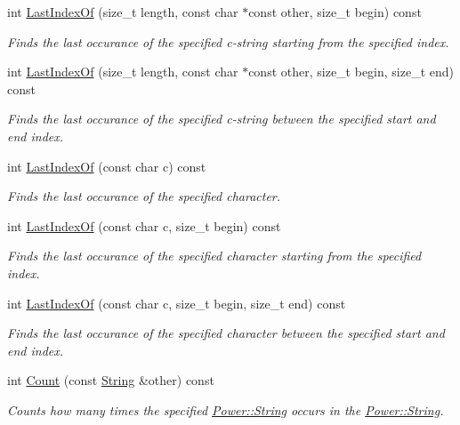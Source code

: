 \begin{DoxyCompactItemize}
int \hyperlink{class_power_1_1_string_a5ba9aa7b251309c1ec5c977f3148e93f}{Last\+Index\+Of} (size\+\_\+t length, const char $\ast$const other, size\+\_\+t begin) const
\begin{DoxyCompactList}\small\item\em Finds the last occurance of the specified c-\/string starting from the specified index. \end{DoxyCompactList}\item 
int \hyperlink{class_power_1_1_string_abf58cac446f5479ae4436974bad5e4af}{Last\+Index\+Of} (size\+\_\+t length, const char $\ast$const other, size\+\_\+t begin, size\+\_\+t end) const
\begin{DoxyCompactList}\small\item\em Finds the last occurance of the specified c-\/string between the specified start and end index. \end{DoxyCompactList}\item 
int \hyperlink{class_power_1_1_string_a5d19cb2d35f6cd396c1910579b5ba89e}{Last\+Index\+Of} (const char c) const
\begin{DoxyCompactList}\small\item\em Finds the last occurance of the specified character. \end{DoxyCompactList}\item 
int \hyperlink{class_power_1_1_string_a0791550659fc2f5c9728eac06208d73c}{Last\+Index\+Of} (const char c, size\+\_\+t begin) const
\begin{DoxyCompactList}\small\item\em Finds the last occurance of the specified character starting from the specified index. \end{DoxyCompactList}\item 
int \hyperlink{class_power_1_1_string_a983604990be4acb0f22ab400b46445ea}{Last\+Index\+Of} (const char c, size\+\_\+t begin, size\+\_\+t end) const
\begin{DoxyCompactList}\small\item\em Finds the last occurance of the specified character between the specified start and end index. \end{DoxyCompactList}\item 
int \hyperlink{class_power_1_1_string_a933dda794524fa9f4cd4324b9c52751c}{Count} (const \hyperlink{class_power_1_1_string}{String} \&other) const
\begin{DoxyCompactList}\small\item\em Counts how many times the specified \hyperlink{class_power_1_1_string}{Power\+::\+String} occurs in the \hyperlink{class_power_1_1_string}{Power\+::\+String}. \end{DoxyCompactList}\item 

\end{DoxyCompactItemize}
